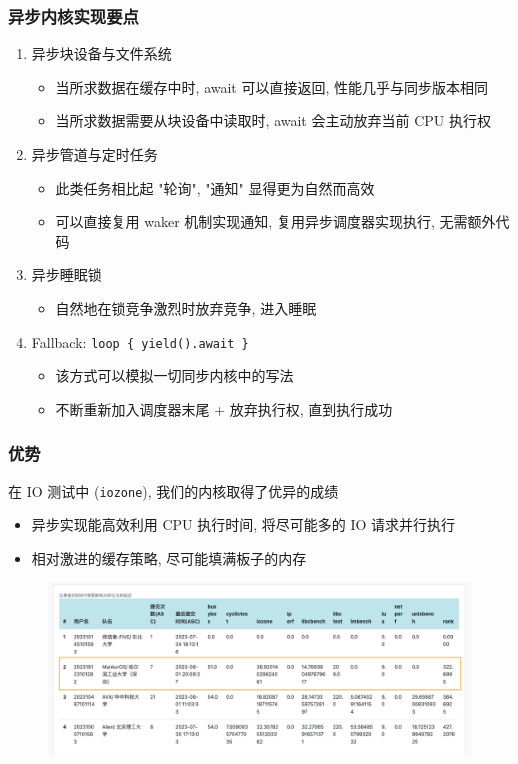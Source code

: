 \begin{frame}
    \frametitle{异步内核实现要点}

    \begin{enumerate}
        \item 异步块设备与文件系统
              \begin{itemize}
                  \item 当所求数据在缓存中时, await 可以直接返回, 性能几乎与同步版本相同
                  \item 当所求数据需要从块设备中读取时, await 会主动放弃当前 CPU 执行权
              \end{itemize}
        \item 异步管道与定时任务
              \begin{itemize}
                  \item 此类任务相比起 "轮询", "通知" 显得更为自然而高效
                  \item 可以直接复用 waker 机制实现通知, 复用异步调度器实现执行, 无需额外代码
              \end{itemize}
        \item 异步睡眠锁
              \begin{itemize}
                  \item 自然地在锁竞争激烈时放弃竞争, 进入睡眠
              \end{itemize}
        \item Fallback: \texttt{loop \{ yield().await \}}
              \begin{itemize}
                  \item 该方式可以模拟一切同步内核中的写法
                  \item 不断重新加入调度器末尾 + 放弃执行权, 直到执行成功
              \end{itemize}
    \end{enumerate}
\end{frame}

\begin{frame}
    \frametitle{优势}

    在 IO 测试中 (\texttt{iozone}), 我们的内核取得了优异的成绩
    \begin{itemize}
        \item 异步实现能高效利用 CPU 执行时间, 将尽可能多的 IO 请求并行执行
        \item 相对激进的缓存策略, 尽可能填满板子的内存
    \end{itemize}

    \begin{figure}
        \includegraphics[width=.75\textwidth]{assets/leaderboard-final1.png}
    \end{figure}
\end{frame}

